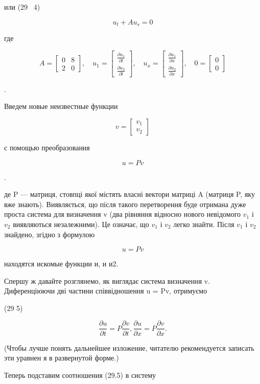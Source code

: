 \documentclass[
  ukrainian,
]{article}
\begin{document}
или (29 ~4)

\[
u_t + Au_s = 0
\]

где

\[
A =
\begin{bmatrix} 0 & 8 \\ 2 & 0 \end{bmatrix}
, \quad u_1 =
\begin{bmatrix} \frac{\partial u_1}{\partial t} \\ \frac{\partial u_2}{\partial t} \end{bmatrix}
, \quad u_x =
\begin{bmatrix} \frac{\partial u_1}{\partial x} \\ \frac{\partial u_2}{\partial x} \end{bmatrix}
, \quad 0 =
\begin{bmatrix} 0 \\ 0 \end{bmatrix}
\]

.

Введем новые неизвестные функции

\[
v =
\begin{bmatrix} v_1 \\ v_2 \end{bmatrix}
\]

с помощью преобразования

\[
u = Pv
\]

.

де P --- матриця, стовпці якої містять власні вектори матриці A (матриця
P, яку вже знають). Виявляється, що після такого перетворення буде
отримана дуже проста система для визначення v (два рівняння відносно
нового невідомого \(v_1\) і \(v_2\) виявляються незалежними). Це
означає, що \(v_1\) і \(v_2\) легко знайти. Після \(v_1\) і \(v_2\)
знайдено, згідно з формулою

\[
u = Pv
\]

находятся искомые функции и, и и2.

Спершу ж давайте розглянемо, як виглядає система визначення v.
Диференціюючи дві частини співвідношення u = Pv, отримуємо

(29 5)

\[
\frac{\partial u}{\partial t} = P \frac{\partial v}{\partial t},
\frac{\partial u}{\partial x} = P \frac{\partial v}{\partial x}.
\]

(Чтобы лучше понять дальнейшее изложение, читателю рекомендуется
записать эти уравнен я в развернутой форме.)

Теперь подставим соотношения (29.5) в систему
\end{document}
